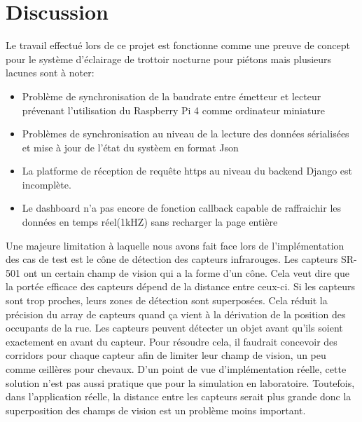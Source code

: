 \documentclass[journal]{IEEEtran}
\begin{document}
\section{Discussion}
Le travail effectué lors de ce projet est fonctionne comme une preuve de concept pour le système d'éclairage de trottoir nocturne pour piétons mais plusieurs lacunes sont à noter:
\begin{itemize}
    \item Problème de synchronisation de la baudrate entre émetteur et lecteur prévenant l'utilisation du Raspberry Pi 4 comme ordinateur miniature
    \item Problèmes de synchronisation au niveau de la lecture des données sérialisées et mise à jour de l'état du systèem en format Json
    \item La platforme de réception de requête https au niveau du backend Django est incomplète.
    \item Le dashboard n'a pas encore de fonction callback capable de raffraichir les données en temps réel(1kHZ) sans recharger la page entière  
\end{itemize}
Une majeure limitation à laquelle nous avons fait face lors de l’implémentation des cas de test est le cône de détection des capteurs infrarouges.
Les capteurs SR-501 ont un certain champ de vision qui a la forme d’un cône. Cela veut dire que la portée efficace des capteurs dépend de la distance entre ceux-ci. 
Si les capteurs sont trop proches, leurs zones de détection sont superposées. Cela réduit la précision du array de capteurs quand ça vient à la dérivation de la position des occupants de la rue. Les capteurs peuvent détecter un objet avant qu’ils soient exactement en avant du capteur. Pour résoudre cela, il faudrait concevoir des corridors pour chaque capteur afin de limiter leur champ de vision, un peu comme œillères pour chevaux. D’un point de vue d’implémentation réelle, cette solution n’est pas aussi pratique que pour la simulation en laboratoire. 
Toutefois, dans l’application réelle, la distance entre les capteurs serait plus grande donc la superposition des champs de vision est un problème moins important.  
\end{document}
